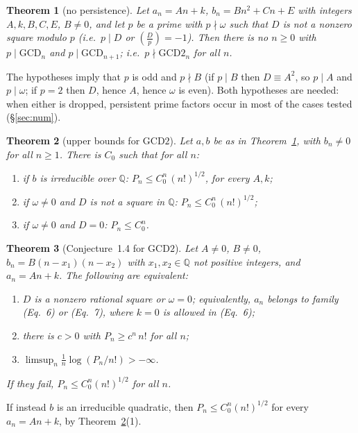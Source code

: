 \documentclass[11pt]{amsart}
\newtheorem{theorem}{Theorem}
\theoremstyle{definition}
\theoremstyle{remark}
\numberwithin{equation}{section}
\newcommand{\Q}{\mathbb{Q}}
\newcommand{\GCD}{\mathrm{GCD}}
\begin{document}
\begin{theorem}[no persistence]\label{thm:C}
Let $a_n=An+k$, $b_n=Bn^2+Cn+E$ with integers $A,k,B,C,E$, $B\neq0$, and let $p$ be a prime with $p\nmid\omega$ such that $D$ is not a nonzero square modulo $p$ (i.e.\ $p\mid D$ or $(\frac Dp)=-1$). Then there is no $n\ge0$ with $p\mid\GCD_n$ and $p\mid\GCD_{n+1}$; i.e.\ $p\nmid\GCD2_n$ for all $n$.
\end{theorem}

The hypotheses imply that $p$ is odd and $p\nmid B$ (if $p\mid B$ then $D\equiv A^2$, so $p\mid A$ and $p\mid\omega$; if $p=2$ then $D$, hence $A$, hence $\omega$ is even). Both hypotheses are needed: when either is dropped, persistent prime factors occur in most of the cases tested (\S\ref{sec:num}).

\begin{theorem}[upper bounds for $\GCD2$]\label{thm:D}
Let $a,b$ be as in Theorem~\ref{thm:C}, with $b_n\neq0$ for all $n\ge1$. There is $C_0$ such that for all $n$:
\begin{enumerate}[label=\textup{(\arabic*)}]
\item if $b$ is irreducible over $\Q$: $P_n\le C_0^n\,(n!)^{1/2}$, for every $A,k$;
\item if $\omega\neq0$ and $D$ is not a square in $\Q$: $P_n\le C_0^n\,(n!)^{1/2}$;
\item if $\omega\neq0$ and $D=0$: $P_n\le C_0^n$.
\end{enumerate}
\end{theorem}

\begin{theorem}[Conjecture~1.4 for $\GCD2$]\label{thm:E}
Let $A\neq0$, $B\neq0$, $b_n=B(n-x_1)(n-x_2)$ with $x_1,x_2\in\Q$ not positive integers, and $a_n=An+k$. The following are equivalent:
\begin{enumerate}[label=\textup{(\alph*)}]
\item $D$ is a nonzero rational square or $\omega=0$; equivalently, $a_n$ belongs to family (Eq.~6) or (Eq.~7), where $k=0$ is allowed in (Eq.~6);
\item there is $c>0$ with $P_n\ge c^n\,n!$ for all $n$;
\item $\limsup_n\frac1n\log(P_n/n!)>-\infty$.
\end{enumerate}
If they fail, $P_n\le C_0^n(n!)^{1/2}$ for all $n$.
\end{theorem}

If instead $b$ is an irreducible quadratic, then $P_n\le C_0^n(n!)^{1/2}$ for every $a_n=An+k$, by Theorem~\ref{thm:D}(1).
\end{document}
